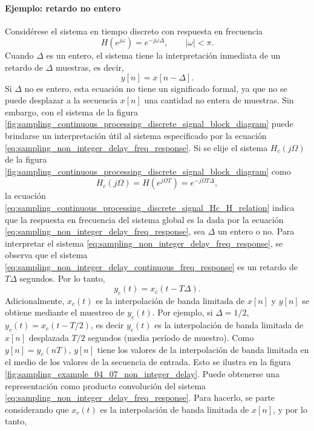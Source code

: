 \documentclass[a4paper]{report}
\begin{document}
\paragraph{Ejemplo: retardo no entero} Considérese el sistema en tiempo discreto con respuesta en frecuencia
\begin{equation}\label{eq:sampling_non_integer_delay_freq_response}
 H(e^{j\omega})=e^{-j\omega\Delta},
 \qquad|\omega|<\pi. 
\end{equation}
Cuando \(\Delta\) es un entero, el sistema tiene la interpretación inmediata de un retardo de \(\Delta\) muestras, es decir,
\[
 y[n]=x[n-\Delta].
\]
Si \(\Delta\) no es entero, esta ecuación no tiene un significado formal, ya que no se puede desplazar a la secuencia \(x[n]\) una cantidad no entera de muestras. Sin embargo, con el sistema de la figura \ref{fig:sampling_continuous_processing_discrete_signal_block_diagram} puede brindarse un interpretación útil al sistema especificado por la ecuación \ref{eq:sampling_non_integer_delay_freq_response}. Si se elije el sistema \(H_c(j\Omega)\) de la figura \ref{fig:sampling_continuous_processing_discrete_signal_block_diagram} como
\begin{equation}\label{eq:sampling_non_integer_delay_continuous_freq_response}
 H_c(j\Omega)=H(e^{j\Omega T})=e^{-j\Omega T\Delta}, 
\end{equation}
la ecuación \ref{eq:sampling_continuous_processing_discrete_signal_Hc_H_relation} indica que la respuesta en frecuencia del sistema global es la dada por la ecuación \ref{eq:sampling_non_integer_delay_freq_response}, sea \(\Delta\) un entero o no. Para interpretar el sistema \ref{eq:sampling_non_integer_delay_freq_response}, se observa que el sistema \ref{eq:sampling_non_integer_delay_continuous_freq_response} es un retardo de \(T\Delta\) segundos. Por lo tanto,
\[
 y_c(t)=x_c(t-T\Delta).
\]
Adicionalmente, \(x_c(t)\) es la interpolación de banda limitada de \(x[n]\) y \(y[n]\) se obtiene mediante el muestreo de \(y_c(t)\). Por ejemplo, si \(\Delta=1/2\), \(y_c(t)=x_c(t-T/2)\), es decir \(y_c(t)\) es la interpolación de banda limitada de \(x[n]\) desplazada \(T/2\) segundos (media período de muestro). Como \(y[n]=y_c(nT)\), \(y[n]\) tiene los valores de la interpolación de banda limitada en el medio de los valores de la secuencia de entrada. Esto se ilustra en la figura \ref{fig:sampling_example_04_07_non_integer_delay}. Puede obtenerse una representación como producto convolución del sistema \ref{eq:sampling_non_integer_delay_freq_response}. Para hacerlo, se parte considerando que \(x_c(t)\) es la interpolación de banda limitada de \(x[n]\), y por lo tanto,
\end{document}
